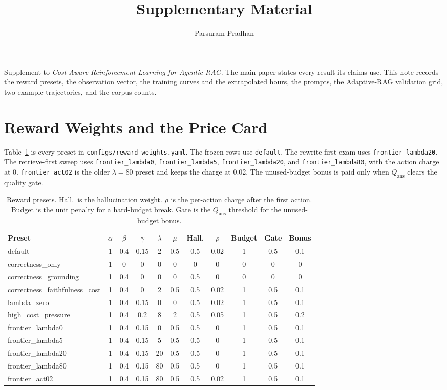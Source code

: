 \documentclass[letterpaper]{article}
\title{Supplementary Material}
\author{Parsuram Pradhan}
\begin{document}
\maketitle

\noindent Supplement to \emph{Cost-Aware Reinforcement Learning for Agentic RAG}. The main paper states every result its claims use. This note records the reward presets, the observation vector, the training curves and the extrapolated hours, the prompts, the Adaptive-RAG validation grid, two example trajectories, and the corpus counts.

\section{Reward Weights and the Price Card}
Table~\ref{tab:presets} is every preset in \texttt{configs/reward\_weights.yaml}. The frozen rows use \texttt{default}. The rewrite-first exam uses \texttt{frontier\_lambda20}. The retrieve-first sweep uses \texttt{frontier\_lambda0}, \texttt{frontier\_lambda5}, \texttt{frontier\_lambda20}, and \texttt{frontier\_lambda80}, with the action charge at 0. \texttt{frontier\_act02} is the older \(\lambda{=}80\) preset and keeps the charge at 0.02. The unused-budget bonus is paid only when \(Q_{\mathrm{ans}}\) clears the quality gate.

\begin{table}[t]
\centering
\small
\begin{tabular}{lcccccccccc}
\toprule
Preset & \(\alpha\) & \(\beta\) & \(\gamma\) & \(\lambda\) & \(\mu\) & Hall. & \(\rho\) & Budget & Gate & Bonus \\
\midrule
default & 1 & 0.4 & 0.15 & 2 & 0.5 & 0.5 & 0.02 & 1 & 0.5 & 0.1 \\
correctness\_only & 1 & 0 & 0 & 0 & 0 & 0 & 0 & 0 & 0 & 0 \\
correctness\_grounding & 1 & 0.4 & 0 & 0 & 0 & 0.5 & 0 & 0 & 0 & 0 \\
correctness\_faithfulness\_cost & 1 & 0.4 & 0 & 2 & 0.5 & 0.5 & 0.02 & 1 & 0.5 & 0.1 \\
lambda\_zero & 1 & 0.4 & 0.15 & 0 & 0 & 0.5 & 0.02 & 1 & 0.5 & 0.1 \\
high\_cost\_pressure & 1 & 0.4 & 0.2 & 8 & 2 & 0.5 & 0.05 & 1 & 0.5 & 0.2 \\
frontier\_lambda0 & 1 & 0.4 & 0.15 & 0 & 0.5 & 0.5 & 0 & 1 & 0.5 & 0.1 \\
frontier\_lambda5 & 1 & 0.4 & 0.15 & 5 & 0.5 & 0.5 & 0 & 1 & 0.5 & 0.1 \\
frontier\_lambda20 & 1 & 0.4 & 0.15 & 20 & 0.5 & 0.5 & 0 & 1 & 0.5 & 0.1 \\
frontier\_lambda80 & 1 & 0.4 & 0.15 & 80 & 0.5 & 0.5 & 0 & 1 & 0.5 & 0.1 \\
frontier\_act02 & 1 & 0.4 & 0.15 & 80 & 0.5 & 0.5 & 0.02 & 1 & 0.5 & 0.1 \\
\bottomrule
\end{tabular}
\caption{Reward presets. Hall.\ is the hallucination weight. \(\rho\) is the per-action charge after the first action. Budget is the unit penalty for a hard-budget break. Gate is the \(Q_{\mathrm{ans}}\) threshold for the unused-budget bonus.}
\label{tab:presets}
\end{table}
\end{document}
